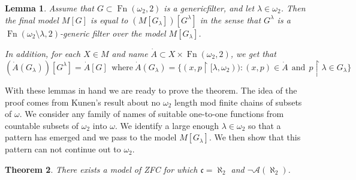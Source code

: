 \documentclass{amsart}
\theoremstyle{plain}
\newtheorem{theorem}{Theorem}
\newtheorem{lemma}[theorem]{Lemma}
\theoremstyle{definition}
\theoremstyle{remark}
\theoremstyle{plain}
\theoremstyle{definition}
\theoremstyle{remark}
\begin{document}
            \begin{lemma}\cite{MR597342}
            Assume that $G\subset \operatorname{Fn}(\omega_2,2)$ is a
             generic\label{factor} filter,
             and let $\lambda\in \omega_2$. Then the final model $M[G]$
            is equal to $(M[G_\lambda])[G^\lambda]$ in the sense that
            $G^\lambda$ is a $\operatorname{Fn}(\omega_2\setminus \lambda,
             2)$-generic filter   over the model $M[G_\lambda]$.

            In addition, for each $X\in M$ and name $\dot A\subset
            X\times \operatorname{Fn}(\omega_2,2)$, we get that
             \[ (\dot A(G_\lambda))[G^\lambda] = \dot A [G]\ \ \mbox{where}\
            \dot A(G_\lambda) =
             \{ (x,p\restriction [\lambda,\omega_2))  :
             (x,p)\in \dot A\ \ \mbox{and} \ \ p\restriction \lambda\in G_\lambda\}
            \]
            \end{lemma}


            With these lemmas in hand we are ready to prove the theorem. The idea
            of the proof comes from  Kunen's result about no $\omega_2$ length mod
            finite chains of subsets of $\omega$. We consider any  family of
            names  of suitable one-to-one functions from countable subsets of
            $\omega_2$ into $\omega$. We identify a large enough $\lambda\in \omega_2$
            so that a pattern has emerged and we pass to the model $M[G_\lambda]$. We
            then show that this pattern can not continue out to $\omega_2$.

            \begin{theorem} There exists a model of ZFC for which
             $\mathfrak c=\aleph_2$ and $\lnot \mathcal A(\aleph_2)$.
            \end{theorem}
\end{document}
